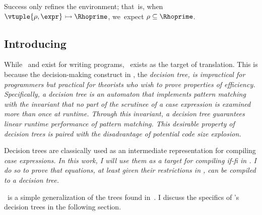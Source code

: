 \documentclass[manuscript,screen,review, 12pt, nonacm]{acmart}
\begin{document}
    \medskip
        
    Success only refines the environment; that~is, when ${\vtuple{\rho, \expr}}
    \rightarrowtail{} {\Rhoprime}$, we~expect $\rho \subseteq \Rhoprime$.
    
    \vfilbreak

\vmsemantics

\subsection{Introducing \D}
\label{d}

While \PPlus\ and \VMinus exist for writing programs, \D\ exists as the target
of translation. This is because the decision-making construct in \D, the
\it{decision tree}, is impractical for programmers but practical for theorists
who wish to prove properties of efficiency. Specifically, a decision tree is an
automaton that implements pattern matching with the invariant that no part of
the scrutinee of a \it{case} expression is examined more than once at runtime.
Through this invariant, a decision tree guarantees linear runtime performance of
pattern matching. This desirable property of decision trees is paired with the
disadvantage of potential code size explosion. 

Decision trees are classically used as an intermediate representation for
compiling \it{case} expressions. In this work, I will use them as a target for
compiling \it{if-fi} in \VMinus. I do so to prove that equations, at least given
their restrictions in \VMinus, can be compiled to a decision tree. 

\D\ is a simple generalization of the trees found in~\citet{maranget}. I discuss
the specifics of \D's decision trees in the following section. 
\end{document}
